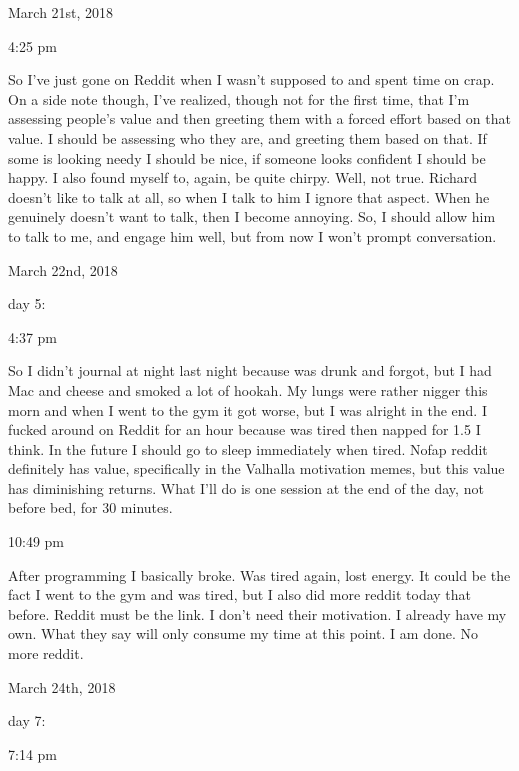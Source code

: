 \bigskip
\bigskip
March 21st, 2018

4:25 pm

So I've just gone on Reddit when I wasn't supposed to and spent time on
crap. On a side note though, I've realized, though not for the first
time, that I'm assessing people's value and then greeting them with a
forced effort based on that value. I should be assessing who they are,
and greeting them based on that. If some is looking needy I should be
nice, if someone looks confident I should be happy. I also found myself
to, again, be quite chirpy. Well, not true. Richard doesn't like to talk
at all, so when I talk to him I ignore that aspect. When he genuinely
doesn't want to talk, then I become annoying. So, I should allow him to
talk to me, and engage him well, but from now I won't prompt
conversation.

\bigskip
\bigskip
March 22nd, 2018

day 5:

4:37 pm

So I didn't journal at night last night because was drunk and forgot,
but I had Mac and cheese and smoked a lot of hookah. My lungs were
rather nigger this morn and when I went to the gym it got worse, but I
was alright in the end. I fucked around on Reddit for an hour because
was tired then napped for 1.5 I think. In the future I should go to
sleep immediately when tired. Nofap reddit definitely has value,
specifically in the Valhalla motivation memes, but this value has
diminishing returns. What I'll do is one session at the end of the day,
not before bed, for 30 minutes.

10:49 pm

After programming I basically broke. Was tired again, lost energy. It
could be the fact I went to the gym and was tired, but I also did more
reddit today that before. Reddit must be the link. I don't need their
motivation. I already have my own. What they say will only consume my
time at this point. I am done. No more reddit.

\bigskip
\bigskip
March 24th, 2018

day 7:

7:14 pm

